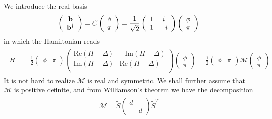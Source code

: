 We introduce the real basis 
\begin{eqnarray}\begin{aligned}
\label{Real basis}
\left(\begin{array}{ccc}
{\bf b}\\
{\bf b}^\dagger
\end{array}\right)
=C\left(\begin{array}{ccc}
\phi\\
\pi
\end{array}\right)
=\frac{1}{\sqrt{2}}\left(\begin{array}{ccc}
1 & i \\
1 & -i
\end{array}\right)\left(\begin{array}{ccc}
\phi\\
\pi
\end{array}\right)
\end{aligned}\end{eqnarray}
in which the Hamiltonian reads
\begin{eqnarray}\begin{aligned}
\hat{H}
&=\frac{1}{2}
\left(\begin{array}{ccc}
\phi & \pi
\end{array}\right)
\left(\begin{array}{ccc}
\text{Re}(H+\Delta) & -\text{Im}(H-\Delta)\\
\text{Im}(H+\Delta)& \text{Re}(H-\Delta) \\
\end{array}\right)
\left(\begin{array}{ccc}
\phi\\
\pi
\end{array}\right)
=\frac{1}{2}
\left(\begin{array}{ccc}
\phi & \pi
\end{array}\right)
\mathcal{M}
\left(\begin{array}{ccc}
\phi\\
\pi
\end{array}\right)
\end{aligned}\end{eqnarray}
It is not hard to realize $\mathcal{M}$ is real and symmetric. We shall further assume that $\mathcal{M}$ is positive definite, and from Williamson's theorem\cite{arnold_mathematical_2010} we have the decomposition
\begin{eqnarray}\begin{aligned}
\mathcal{M}=\tilde{S}\left(\begin{array}{ccc}
d\\
&d
\end{array}\right)\tilde{S}^T
\end{aligned}\end{eqnarray}
